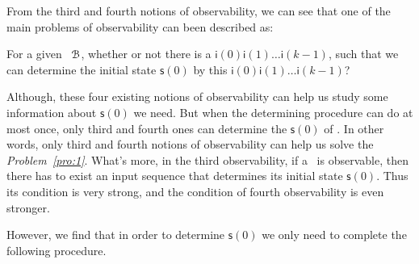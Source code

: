  From the third and fourth notions of observability, we can see that one of the main problems of observability can been described as: 

\begin{problem}
\label{pro:1}
For a given \BCN\ ${\mathcal{B}}$, whether or not there is a $\mathsf{i}(0)\mathsf{i}(1)\ldots\mathsf{i}(k-1)$, such that we can determine the initial state $\mathsf{s}(0)$ by this $\mathsf{i}(0)\mathsf{i}(1)\ldots\mathsf{i}(k-1)$?
\end{problem}

Although, these four existing notions of observability can help us study some information about $\mathsf{s}(0)$ we need. But when the determining procedure can do at most once, only third and fourth ones  can  determine the $\mathsf{s}(0)$ of \BCNs.
In other words, only third and fourth notions of observability can help us solve the {\em Problem~\ref{pro:1}}. What's more, in the third observability, if a \BCN\ is observable, then there has to exist an input sequence that determines its initial state $\mathsf{s}(0)$. Thus its condition is very strong, and the condition of fourth observability is even stronger.


However, we find that in order to determine $\mathsf{s}(0)$ we only need to complete the following procedure.

